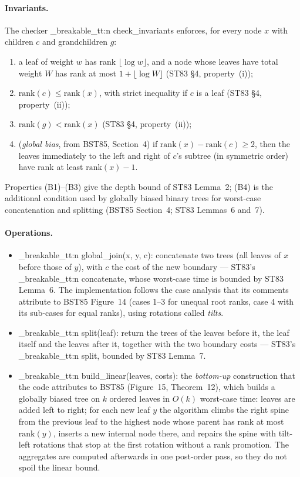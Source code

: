 \documentclass[11pt,a4paper,oneside]{report}
\theoremstyle{plain}
\theoremstyle{definition}
\theoremstyle{remark}
\DeclareRobustCommand{\code}[1]{\mtp_breakable_tt:n {#1}}
\begin{document}
\paragraph{Invariants.} The checker \code{check_invariants} enforces, for every node \(x\) with
children \(c\) and grandchildren \(g\):
\begin{enumerate}[label=(B\arabic*)]
\item a leaf of weight \(w\) has rank \(\lfloor\log w\rfloor\), and a node whose leaves have
  total weight \(W\) has rank at most \(1+\lfloor\log W\rfloor\) (ST83 \S4, property~(i));
\item \(\mathrm{rank}(c)\le\mathrm{rank}(x)\), with strict inequality if \(c\) is a leaf
  (ST83 \S4, property~(ii));
\item \(\mathrm{rank}(g)<\mathrm{rank}(x)\) (ST83 \S4, property~(ii));
\item (\emph{global bias}, from BST85, Section~4) if
  \(\mathrm{rank}(x)-\mathrm{rank}(c)\ge 2\), then the leaves immediately to the left and right
  of \(c\)'s subtree (in symmetric order) have rank at least \(\mathrm{rank}(x)-1\).
\end{enumerate}
Properties (B1)--(B3) give the depth bound of ST83 Lemma~2; (B4) is the additional condition
used by globally biased binary trees for worst-case concatenation and splitting (BST85 Section~4; ST83 Lemmas~6 and~7).

\paragraph{Operations.}
\begin{itemize}
\item \code{global_join(x, y, c)}: concatenate two trees (all leaves of \(x\) before those of
  \(y\)), with \(c\) the cost of the new boundary --- ST83's \code{concatenate}, whose worst-case
  time is bounded by ST83 Lemma~6. The implementation follows the case analysis that its comments
  attribute to BST85 Figure~14 (cases 1--3 for unequal root ranks, case 4 with its sub-cases for
  equal ranks), using rotations called \emph{tilts}.
\item \code{split(leaf)}: return the trees of the leaves before it, the leaf itself and the
  leaves after it, together with the two boundary costs --- ST83's \code{split}, bounded by ST83
  Lemma~7.
\item \code{build_linear(leaves, costs)}: the \emph{bottom-up} construction that the code
  attributes to BST85 (Figure~15, Theorem~12), which builds a globally biased tree on \(k\)
  ordered leaves in \(O(k)\) worst-case time: leaves are added left to right; for each new leaf \(y\) the algorithm
  climbs the right spine from the previous leaf to the highest node whose parent has rank at
  most \(\mathrm{rank}(y)\), inserts a new internal node there, and repairs the spine with
  tilt-left rotations that stop at the first rotation without a rank promotion. The aggregates
  are computed afterwards in one post-order pass, so they do not spoil the linear bound.
\end{itemize}
\end{document}
